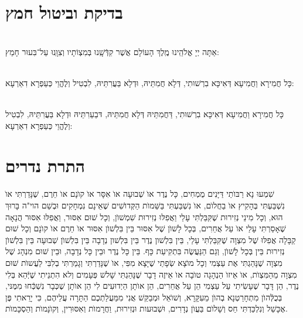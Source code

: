 \documentclass[twoside, openany, parskip=half, 11pt]{book}
\begin{document}
\chapter[בדיקת וביטול חמץ]{ בדיקת וביטול חמץ }

\\
 אַתָּה יְיָ אֱלֹהֵֽינוּ מֶֽלֶךְ הָעוֹלָם אֲשֶׁר קִדְּֿשָֽׁנוּ בְּמִצְוֹתָיו וְצִוָּֽנוּ עַל־בִּעוּר חָמֵץ:
 
 
\\
כָּל חֲמִירָא וַחֲמִיעָא דְּאִיכָּא בִרְשׁוּתִי, דְּלָא חֲמִתֵּיהּ, וּדְלָא בַּעֲרִתֵּיהּ, לִבְטִיל וְלֶהֱוֵי כְּעַפְרָא דִאַרְעָא:


\\
כָּל חֲמִירָא וַחֲמִיעָא דְּאִיכָּא בִרְשׁוּתִי, דַּחֲמִתֵּיהּ דְּלָא חֲמִתֵּיהּ, דּבַעַרִתֵּיהּ וּדְלָא בַּעֲרִתֵּיהּ, לִבְטִיל וְלֶהֱוֵי כְּעַפְרָא דִאַרְעָא:



\chapter[התרת נדרים]{ התרת נדרים }


שִׁמְעוּ נָא רַבּוׂתַי דַּיָּנִים מֻמְחִים, כָּל נֶדֶר אוׂ שְׁבוּעָה אוׂ אִסָּר אוׂ קוׂנָם אוׂ חֵרֶם, שֶׁנָּדַרְתִּי אוׂ נִשְׁבַּעְתִּי בְּהָקִיץ אוׂ בַחֲלוׂם, אוׂ נִשְׁבַּעְתִּי בַּשֵּׁמוׂת הַקְּדוׂשִׁים שֶׁאֵינָם נִמְחָקִים וּבְשֵׁם הוי"ה בָּרוּךְ הוּא, וְכָל מִינֵי נְזִירוּת שֶׁקִּבַּלְתִּי עָלַי וַאֲפִלּוּ נְזִירוּת שִׁמְשׁוׂן, וְכָל שׁוּם אִסּוּר, וַאֲפִלּוּ אִסּוּר הֲנָאָה שֶׁאָסַרְתִּי עָלַי אוׂ עַל אֲחֵרִים, בְּכָל לָשׁוׂן שֶׁל אִסּוּר בֵּין בִּלְשׁוׂן אִסּוּר אוׂ חֵרֶם אוׂ קוׂנָם וְכָל שׁוּם קַבָּלָה אֲפִלּוּ שֶׁל מִצְוָה שֶׁקִּבַּלְתִּי עָלַי, בֵּין בִּלְשׁון נֶדֶר בֵּין בִּלְשׁון נְדָבָה בֵּין בִּלְשׁוׂן שְׁבוּעָה בֵּין בִּלְשׁוׂן נְזִירוּת בֵּין בְּכָל לָשׁוׂן, וְגַם הַנַּעֲשֶׂה בִּתְקִיעַת כָּף. בֵּין כָּל נֶדֶר וּבֵין כָּל נְדָבָה, וּבֵין שׁוּם מִנְהָג שֶׁל מִצְוָה שֶׁנָּהַגְתִּי אֶת עַצְמִי וְכָל מוׂצָא שְׂפָתַי שֶׁיָּצָא מִפִּי, אוׂ שֶׁנָּדַרְתִּי וְגָמַרְתִּי בְלִבִּי לַעֲשוׂת שׁוּם מִצְוָה מֵהַמִּצְוׂת, אוׂ אֵיזוׂ הַנְהָגָה טוׂבָה אוׂ אֵיזֶה דָבָר שֶׁנָּהַגְתִּי שָׁלשׁ פְּעָמִים וְלא הִתְנֵיתִי שֶׁיְּֿהֵא בְּלִי נֶדֶר, הֵן דָּבָר שֶׁעָשִׂיתִי עַל עַצְמִי הֵן עַל אֲחֵרִים, הֵן אוׂתָן הַיְדוּעִים לִי הֵן אוׂתָן שֶׁכְּבָר נִשְׁכְּֿחוּ מִמֶּנּי, בְּכֻלְּֿהוׂן מִתְחָרַטְנָא בְהוׂן מֵעִקָּרָא, וְשׁוׂאֵל וּמְבַקֵּשׁ אֲנִי מִמַּעֲלַתְכֶם הַתָּרָה עֲלֵיהֶם, כִּי יָרֵאתִי פֶּן אֶכָּשֵׁל וְנִלְכַּדְתִּי חַס וְשָׁלוׂם בַּעֲוׂן נְדָרִים, וּשְׁבוּעות וּנְזִירוּת, וַחֲרָמוׂת וְאִסּוּרִין, וְקוׂנָמוׂת וְהַסְכָּמוׂת.
\end{document}
